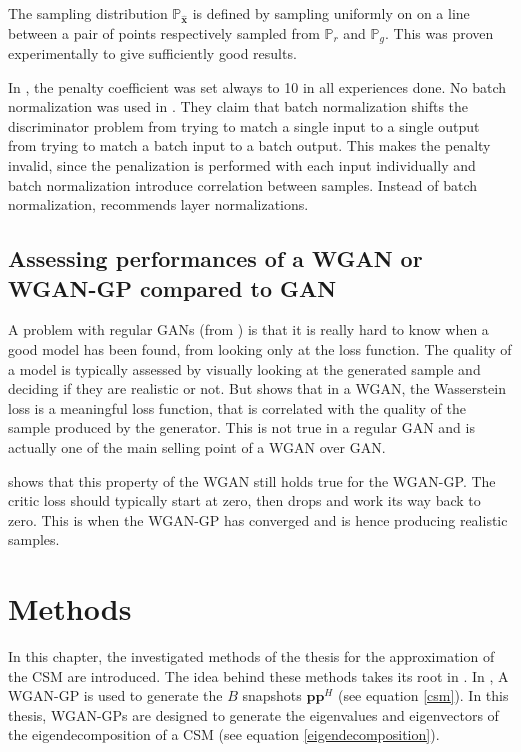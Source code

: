\documentclass[11pt,a4paper,twoside]{report}
\begin{document}
The sampling distribution $\mathbb{P}_{\hat{\mathbf{x}}}$ is defined by sampling uniformly on on a line between a pair of points respectively sampled from $\mathbb{P}_{r}$ and $\mathbb{P}_{g}$. This was proven experimentally to give sufficiently good results.

In \cite{DBLP:journals/corr/GulrajaniAADC17}, the penalty coefficient was set always to 10 in all experiences done. No batch normalization was used in \cite{DBLP:journals/corr/GulrajaniAADC17}. They claim that batch normalization shifts the discriminator problem from trying to match a single input to a single output from trying to match a batch input to a batch output. This makes the penalty invalid, since the penalization is performed with each input individually and batch normalization introduce correlation between samples. Instead of batch normalization, \cite{DBLP:journals/corr/GulrajaniAADC17} recommends layer normalizations.

\section{Assessing performances of a WGAN or WGAN-GP compared to GAN} \label{sec:assessing_perf}

A problem with regular GANs (from \cite{goodfellow2020generative}) is that it is really hard to know when a good model has been found, from looking only at the loss function. The quality of a model is typically assessed by visually looking at the generated sample and deciding if they are realistic or not. But \cite{arjovsky2017wasserstein} shows that in a WGAN, the Wasserstein loss is a meaningful loss function, that is correlated with the quality of the sample produced by the generator. This is not true in a regular GAN and is actually one of the main selling point of a WGAN over GAN.

\cite{DBLP:journals/corr/GulrajaniAADC17} shows that this property of the WGAN still holds true for the WGAN-GP. The critic loss should typically start at zero, then drops and work its way back to zero. This is when the WGAN-GP has converged and is hence producing realistic samples.

\chapter{Methods}

In this chapter, the investigated methods of the thesis for the approximation of the CSM are introduced. The idea behind these methods takes its root in \cite{gerstoft2020parametric}. In \cite{gerstoft2020parametric}, A WGAN-GP is used to generate the $B$ snapshots $\mathbf{p} \mathbf{p}^H$ (see equation \ref{csm}). In this thesis, WGAN-GPs are designed to generate the eigenvalues and eigenvectors of the eigendecomposition of a CSM (see equation \ref{eigendecomposition}).
\end{document}
